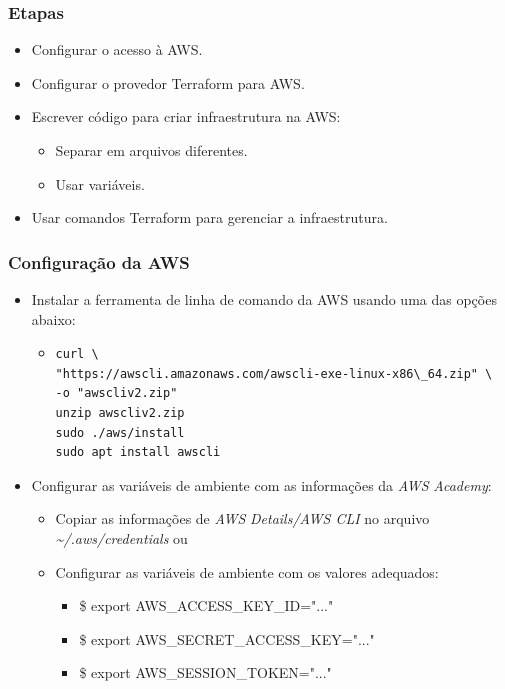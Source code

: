 \documentclass{beamer}
\begin{document}
   \begin{frame}
      \frametitle{Etapas}
      \begin{itemize}
      \item Configurar o acesso à AWS.
      \item Configurar o provedor Terraform para AWS.
      \item Escrever código\textit{ }para criar infraestrutura na AWS:
      \begin{itemize}
      \item Separar em arquivos diferentes.
      \item Usar variáveis. 
      \end{itemize}
      \item Usar comandos Terraform para gerenciar a infraestrutura.
      \end{itemize}
   \end{frame}

   \begin{frame}[fragile]
      \frametitle{Configuração da AWS }
      \begin{itemize}
      \item Instalar a ferramenta de linha de comando da AWS usando uma das opções abaixo:
      \begin{itemize}
      \item 
      \footnotesize
      \begin{verbatim}
curl \
"https://awscli.amazonaws.com/awscli-exe-linux-x86\_64.zip" \
-o "awscliv2.zip"
unzip awscliv2.zip
sudo ./aws/install
sudo apt install awscli
      \end{verbatim}
      \normalsize
      \end{itemize}
      \item Configurar as variáveis de ambiente com as informações da \textit{AWS }\textit{Academy}:
      \begin{itemize}
      \item Copiar as informações de \textit{AWS }\textit{Details}\textit{/AWS CLI }no arquivo \textit{\~{}/.}\textit{aws}\textit{/}\textit{credentials}\textit{ }ou
      \item Configurar as variáveis de ambiente com os valores adequados:
      \begin{itemize}
      \item \$ export AWS\_ACCESS\_KEY\_ID="..."
      \item \$ export AWS\_SECRET\_ACCESS\_KEY="..."
      \item \$ export AWS\_SESSION\_TOKEN="..."
      \end{itemize}
      \end{itemize}
      \end{itemize}
   \end{frame}
\end{document}
